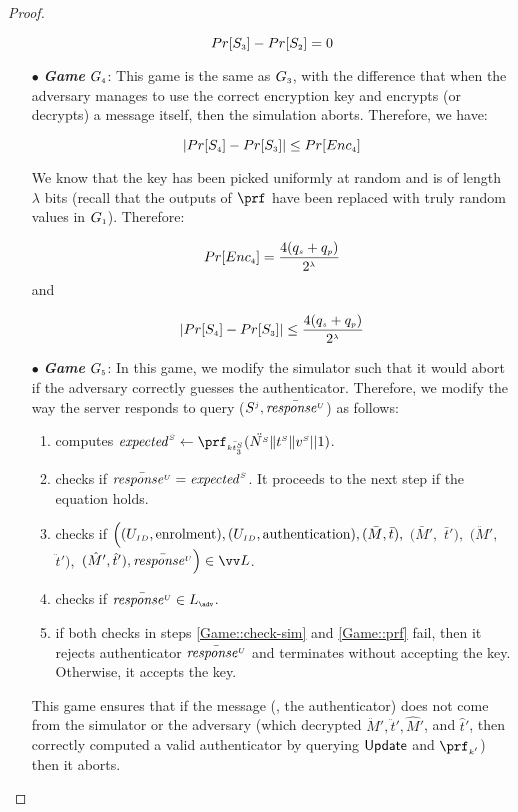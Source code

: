 \begin{proof}
\begin{itemize}
\begin{equation}\label{eq::game_3}
Pr[S_{\scriptscriptstyle  3}]-Pr[S_{\scriptscriptstyle  2}]=0
\end{equation}
%
\item[$\bullet$] \textit{\textbf{Game}}  $G_{\scriptscriptstyle  4}$: This game is the same as $G_{\scriptscriptstyle  3}$, with the difference that when the adversary manages to use the correct encryption key and encrypts (or decrypts) a message itself, then the simulation aborts. Therefore, we have: 

\begin{equation*}
|Pr[S_{\scriptscriptstyle  4}]-Pr[S_{\scriptscriptstyle  3}]|\leq Pr[Enc_{\scriptscriptstyle  4}]
\end{equation*}


We know that the key has been picked uniformly at random and is of length $\lambda$ bits (recall that the outputs of $\prf$ have been replaced with truly random values in $G_{\scriptscriptstyle  1}$). Therefore:

 $$Pr[Enc_{\scriptscriptstyle  4}]=\frac{4(q_{\scriptscriptstyle  s}+q_{\scriptscriptstyle  p})}{2^{\scriptscriptstyle \lambda}}$$ and 
 
 \begin{equation}\label{eq::game_4}
 |Pr[S_{\scriptscriptstyle  4}]-Pr[S_{\scriptscriptstyle  3}]|\leq \frac{4(q_{\scriptscriptstyle  s}+q_{\scriptscriptstyle  p})}{2^{\scriptscriptstyle \lambda}}
 \end{equation}
%

\item[$\bullet$] \textit{\textbf{Game}}  $G_{\scriptscriptstyle  5}$: In this game, we modify the simulator such that it would abort if
the adversary correctly guesses the authenticator. Therefore, we modify the way the server responds to  query {\send($S^{\scriptscriptstyle  j},   \bar{\mathit{response}^{\scriptscriptstyle U}}$)} as follows: 

\begin{enumerate}
%
\item computes $\VS{\mathit{expected}} \gets \prf_{\sss\bar{\VS{\keyt_{\sss3}}}}(\ddot{\VS{\nonce}}  \| \VS{\trans} \| \VS{\verifier}|| 1)$.
%
\item checks if $\bar{\mathit{response}^{\scriptscriptstyle U}}=\mathit{expected}^{\scriptscriptstyle S}$. It proceeds to the next step if the equation holds. 
%
\item\label{Game::check-sim} checks if $\Big((U_{\scriptscriptstyle  ID},  \text{enrolment}), (U_{\scriptscriptstyle  ID},  \text{authentication}), (\bar M, \bar t),$ $ (\bar M',$ $ \bar t'),$ $ (\ddot M', $ $\ddot t'), $ $(\hat M', \hat t'), \bar{\VC{\mathit{response}}}\Big)\in \vv L$.

\item\label{Game::prf} checks if $ \bar{\VC{\mathit{response}}}\in L_{\sss \adv}$. 
%
\item if both checks in steps \ref{Game::check-sim} and \ref{Game::prf} fail, then it rejects authenticator $\bar{\mathit{response}^{\scriptscriptstyle U}}$ and terminates without accepting the key. Otherwise, it accepts the key. 
%
\end{enumerate}
This game ensures that if the message (\ie, the authenticator) does not come from the simulator or the adversary (which decrypted $\ddot M',\ddot t', \hat M'$, and  $\hat t'$, then correctly computed a valid authenticator by querying $\mathsf{Update}$ and $\prf_{\sss  k'}$) then it aborts. 


\end{itemize}
\end{proof}
